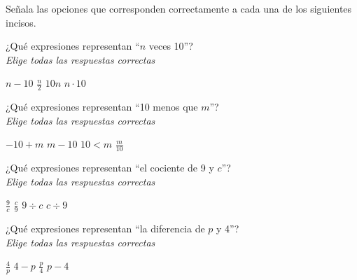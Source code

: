 Señala las opciones que corresponden correctamente a cada una de los siguientes incisos.

\begin{parts}
    ¿Qué expresiones representan ``$n$ veces 10''?\\
    \emph{Elige todas las respuestas correctas}\\

    \begin{checkboxes}
        \choice $n-10$
        \choice $\frac{n}{2}$
        \CorrectChoice $10n$
        \CorrectChoice $n\cdot 10$
    \end{checkboxes}

    ¿Qué expresiones representan ``10 menos que $m$''?\\
    \emph{Elige todas las respuestas correctas}\\

    \begin{checkboxes}
        \CorrectChoice $-10+m$
        \CorrectChoice $m-10$
        \choice $10<m$
        \choice $\frac{m}{10}$
    \end{checkboxes}

    ¿Qué expresiones representan ``el cociente de 9 y $c$''?\\
    \emph{Elige todas las respuestas correctas}\\

    \begin{checkboxes}
        \CorrectChoice $\frac{9}{c}$
        \choice $\frac{c}{9}$
        \CorrectChoice $9 \div c$
        \choice $c \div 9$
    \end{checkboxes}

    ¿Qué expresiones representan ``la diferencia de $p$ y 4''?\\
    \emph{Elige todas las respuestas correctas}\\

    \begin{checkboxes}
        \choice $\frac{4}{p}$
        \CorrectChoice $4-p$
        \choice $\frac{p}{4}$
        \CorrectChoice $p-4$
    \end{checkboxes}
\end{parts}
